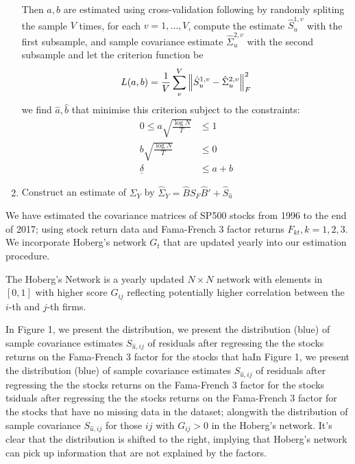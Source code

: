\begin{enumerate}
Then \(a,b\) are estimated using cross-validation following \cite{bickel2008CovarianceRegularization} by randomly spliting the sample \(V\) times, for each \(v = 1,\dots,V\), compute the estimate \(\hat{S}^{1,v}_{u}\) with the first subsample, and sample covariance estimate \(\hat{\Sigma}^{2,v}_{u}\) with the second subsample and let the criterion function be
\begin{equation*}
    L(a, b) = \frac{1}{V} \sum_{v}^{V} \norm{\hat{S}^{1,v}_{u} - \hat{\Sigma}^{2,v}_{u}}^{2}_{F}
\end{equation*}
we find \(\hat{a},\hat{b}\) that minimise this criterion subject to the constraints:
\begin{align}
    0 \leq a \sqrt{\frac{\log N}{T}} &\leq 1 \\
    b \sqrt{\frac{\log N}{T}} &\leq 0 \\
    \underline{\delta} &\leq a + b 
\end{align}
\item Construct an estimate of \(\Sigma_{Y}\) by \(\hat{\Sigma}_{Y} = \hat{B}S_{F}\hat{B}' +\hat{S}_{\hat{u}}\)
\end{enumerate}

We have estimated the covariance matrices of SP500 stocks from 1996 to the end of 2017; using stock return data and Fama-French 3 factor returns \(F_{kt}, k =1,2,3\). We incorporate Hoberg's network \(G_{t}\) that are updated yearly into our estimation procedure. 

The Hoberg's Network is a yearly updated \(N\times N\) network with elements in \([0,1]\) with higher score \(G_{ij}\) reflecting potentially higher correlation between the \(i\)-th and \(j\)-th firms.


In Figure 1, we present the distribution, we present the distribution (blue) of sample covariance estimates \(S_{\hat{u}, ij}\) of residuals after regressing the the stocks returns on the Fama-French 3 factor for the stocks that haIn Figure 1, we present the distribution (blue) of sample covariance estimates \(S_{\hat{u}, ij}\) of residuals after regressing the the stocks returns on the Fama-French 3 factor for the stocks tsiduals after regressing the the stocks returns on the Fama-French 3 factor for the stocks that have no missing data in the dataset; alongwith the distribution of  sample covariance \(S_{\hat{u},ij}\) for those \(ij\) with \(G_{ij} > 0\) in the Hoberg's network. It's clear that the distribution is shifted to the right, implying that Hoberg's network can pick up information that are not explained by the factors. 

